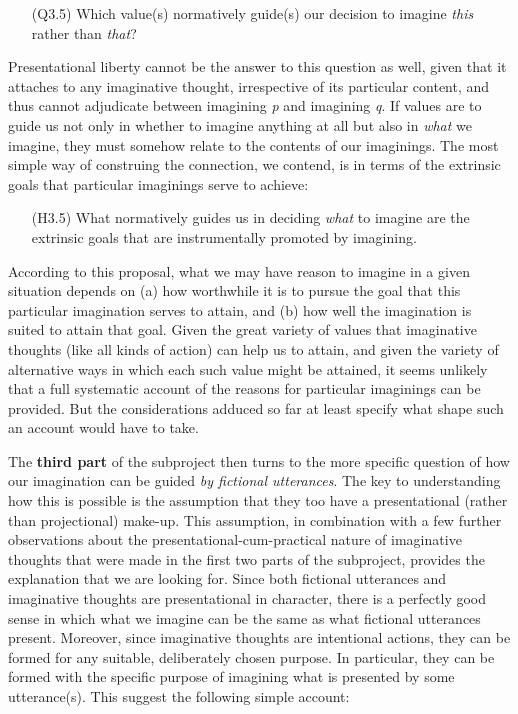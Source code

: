 \vspace{-.1cm}
\begin{itemize}[leftmargin=2cm]
\item[(Q3.5)] Which value(s) normatively guide(s) our decision to imagine \emph{this} rather than \emph{that}?
\end{itemize}
\vspace{-.1cm}

\noindent Presentational liberty cannot be the answer to this question as well, given that it attaches to any imaginative thought, irrespective of its particular content, and thus cannot adjudicate between imagining \emph{p} and imagining \emph{q}. If values are to guide us not only in whether to imagine anything at all but also in \emph{what} we imagine, they must somehow relate to the contents of our imaginings. The most simple way of construing the connection, we contend, is in terms of the extrinsic goals that particular imaginings serve to achieve:

\vspace{-.1cm}
\begin{itemize}[leftmargin=2cm]
\item[(H3.5)] What normatively guides us in deciding \emph{what} to imagine are the extrinsic goals that are instrumentally promoted by imagining.
\end{itemize}
\vspace{-.1cm}

\noindent According to this proposal, what we may have reason to imagine in a given situation depends on (a) how worthwhile it is to pursue the goal that this particular imagination serves to attain, and (b) how well the imagination is suited to attain that goal. Given the great variety of values that imaginative thoughts (like all kinds of action) can help us to attain, and given the variety of alternative ways in which each such value might be attained, it seems unlikely that a full systematic account of the reasons for particular imaginings can be provided. But the considerations adduced so far at least specify what shape such an account would have to take.

The \textbf{third part} of the subproject then turns to the more specific question of how our imagination can be guided \emph{by fictional utterances}. The key to understanding how this is possible is the assumption that they too have a presentational (rather than projectional) make-up. This assumption, in combination with a few further observations about the presentational-cum-practical nature of imaginative thoughts that were made in the first two parts of the subproject, provides the explanation that we are looking for. Since both fictional utterances and imaginative thoughts are presentational in character, there is a perfectly good sense in which what we imagine can be the same as what fictional utterances present. Moreover, since imaginative thoughts are intentional actions, they can be formed for any suitable, deliberately chosen purpose. In particular, they can be formed with the specific purpose of imagining what is presented by some utterance(s). This suggest the following simple account:

